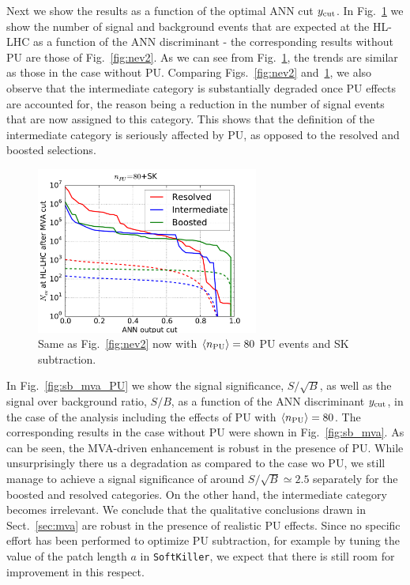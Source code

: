 Next we show the results
as a function of the optimal ANN cut $y_{\rm cut}$.
%
In Fig.~\ref{fig:nev2_PU}
we show the number of signal and background events that
are expected at the HL-LHC as a function of the ANN discriminant -
the corresponding results without PU are those of
Fig.~\ref{fig:nev2}.
%
As we can see from Fig.~\ref{fig:nev2_PU}, the trends are
similar as those in the case without PU.
%
Comparing Figs.~\ref{fig:nev2} and~\ref{fig:nev2_PU}, we also observe
that the intermediate category is substantially degraded once PU effects
are accounted for, the reason being a reduction in the number of signal
events that are now assigned to this category.
%
This shows that the definition of the intermediate category is seriously
affected by PU, as opposed to the resolved and boosted selections.

\begin{figure}[t]
\begin{center}
\includegraphics[width=0.65\textwidth]{plots/nev2_SKPU80.pdf}
\caption{\small Same as Fig.~\ref{fig:nev2} now
  with  $\left\langle n_{\rm PU}\right\rangle=80$ PU events 
  and SK subtraction.
}
\label{fig:nev2_PU}
\end{center}
\end{figure}


In Fig.~\ref{fig:sb_mva_PU} we show the signal significance,
$S/\sqrt{B}$, as well as the signal over background ratio,
$S/B$, as a function of the ANN discriminant $y_{\rm cut}$, in the case
of the analysis including the effects of PU
with $\left\langle n_{\rm PU}\right\rangle=80$.
%
The corresponding results in the case without PU were shown in
Fig.~\ref{fig:sb_mva}.
%
As can be seen, the MVA-driven enhancement is robust in the
presence of PU.
%
While unsurprisingly there us a degradation as compared to the case wo PU,
we still manage to achieve a signal significance of
around $S/\sqrt{B}\simeq 2.5$ separately for the boosted and resolved
categories.
%
On the other hand, the intermediate category becomes irrelevant.
%
We conclude that the qualitative conclusions drawn in
Sect.~\ref{sec:mva} are robust in the presence
of realistic PU effects.
%
Since no specific effort has been performed to
optimize PU subtraction, for example by tuning the value
of the patch length $a$ in {\tt SoftKiller}, we expect that
there is
still room for improvement in this respect.


